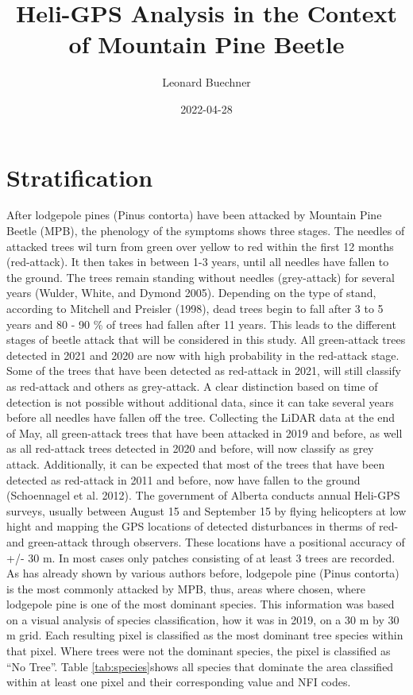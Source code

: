 \documentclass[
]{article}
\title{Heli-GPS Analysis in the Context of Mountain Pine Beetle}
\author{Leonard Buechner}
\date{2022-04-28}
\begin{document}
\maketitle

{
\setcounter{tocdepth}{2}
\tableofcontents
}
\hypertarget{stratification}{%
\section{Stratification}\label{stratification}}

After lodgepole pines (Pinus contorta) have been attacked by Mountain Pine Beetle (MPB), the phenology of the symptoms shows three stages. The needles of attacked trees wil turn from green over yellow to red within the first 12 months (red-attack). It then takes in between 1-3 years, until all needles have fallen to the ground. The trees remain standing without needles (grey-attack) for several years (Wulder, White, and Dymond 2005). Depending on the type of stand, according to Mitchell and Preisler (1998), dead trees begin to fall after 3 to 5 years and 80 - 90 \% of trees had fallen after 11 years.
This leads to the different stages of beetle attack that will be considered in this study. All green-attack trees detected in 2021 and 2020 are now with high probability in the red-attack stage. Some of the trees that have been detected as red-attack in 2021, will still classify as red-attack and others as grey-attack. A clear distinction based on time of detection is not possible without additional data, since it can take several years before all needles have fallen off the tree. Collecting the LiDAR data at the end of May, all green-attack trees that have been attacked in 2019 and before, as well as all red-attack trees detected in 2020 and before, will now classify as grey attack. Additionally, it can be expected that most of the trees that have been detected as red-attack in 2011 and before, now have fallen to the ground (Schoennagel et al. 2012).
The government of Alberta conducts annual Heli-GPS surveys, usually between August 15 and September 15 by flying helicopters at low hight and mapping the GPS locations of detected disturbances in therms of red- and green-attack through observers. These locations have a positional accuracy of +/- 30 m. In most cases only patches consisting of at least 3 trees are recorded.
As has already shown by various authors before, lodgepole pine (Pinus contorta) is the most commonly attacked by MPB, thus, areas where chosen, where lodgepole pine is one of the most dominant species. This information was based on a visual analysis of species classification, how it was in 2019, on a 30 m by 30 m grid. Each resulting pixel is classified as the most dominant tree species within that pixel. Where trees were not the dominant species, the pixel is classified as ``No Tree''. Table \ref{tab:species}shows all species that dominate the area classified within at least one pixel and their corresponding value and NFI codes.
\end{document}
